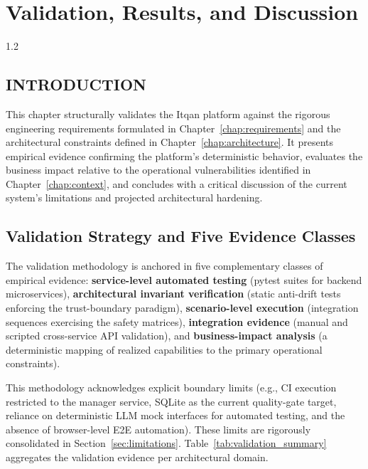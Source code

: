 \chapter{Validation, Results, and Discussion}\label{chap:validation}
\begin{spacing}{1.2}
\minitoc
\thispagestyle{MyStyle}
\end{spacing}
\newpage

\section*{INTRODUCTION}
This chapter structurally validates the Itqan platform against the rigorous engineering requirements formulated in Chapter~\ref{chap:requirements} and the architectural constraints defined in Chapter~\ref{chap:architecture}. It presents empirical evidence confirming the platform's deterministic behavior, evaluates the business impact relative to the operational vulnerabilities identified in Chapter~\ref{chap:context}, and concludes with a critical discussion of the current system's limitations and projected architectural hardening.

\section{Validation Strategy and Five Evidence Classes}
The validation methodology is anchored in five complementary classes of empirical evidence: \textbf{service-level automated testing} (pytest suites for backend microservices), \textbf{architectural invariant verification} (static anti-drift tests enforcing the trust-boundary paradigm), \textbf{scenario-level execution} (integration sequences exercising the safety matrices), \textbf{integration evidence} (manual and scripted cross-service API validation), and \textbf{business-impact analysis} (a deterministic mapping of realized capabilities to the primary operational constraints).

This methodology acknowledges explicit boundary limits (e.g., CI execution restricted to the manager service, SQLite as the current quality-gate target, reliance on deterministic LLM mock interfaces for automated testing, and the absence of browser-level E2E automation). These limits are rigorously consolidated in Section~\ref{sec:limitations}. Table~\ref{tab:validation_summary} aggregates the validation evidence per architectural domain.

